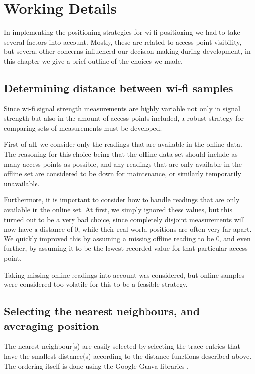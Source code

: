 \section{Working Details}

In implementing the positioning strategies for wi-fi positioning we had to take several factors into account. Mostly, these are related to access point visibility, but several other concerns influenced our decision-making during development, in this chapter we give a brief outline of the choices we made.

\subsection{Determining distance between wi-fi samples}

Since wi-fi signal strength measurements are highly variable not only  in signal strength but also in the amount of access points included, a robust strategy for comparing sets of measurements must be developed.

First of all, we consider only the readings that are available in the online data. The reasoning for this choice being that the offline data set should include as many access points as possible, and any readings that are only available in the offline set are considered to be down for maintenance, or similarly temporarily unavailable.

Furthermore, it is important to consider how to handle readings that are only available in the online set. At first, we simply ignored these values, but this turned out to be a very bad choice, since completely disjoint measurements will now have a distance of 0, while their real world positions are often very far apart.
We quickly improved this by assuming a missing offline reading to be 0, and even further, by assuming it to be the lowest recorded value for that particular access point.

Taking missing online readings into account was considered, but online samples were considered too volatile for this to be a feasible strategy.

\subsection{Selecting the nearest neighbours, and averaging position}

The nearest neighbour(s) are easily selected by selecting the trace entries that have the smallest distance(s) according to the distance functions described above. The ordering itself is done using the Google Guava libraries \citep{Guava}.

